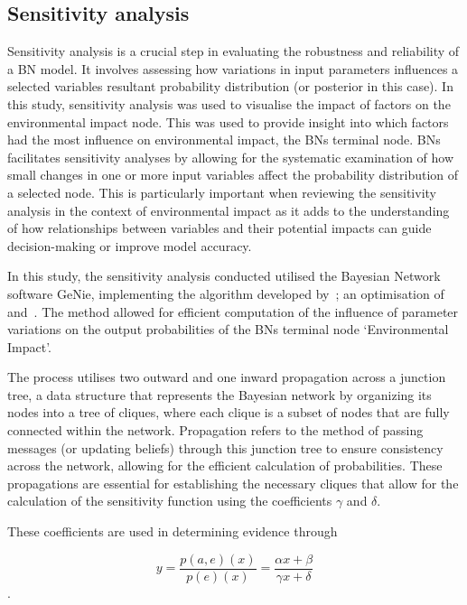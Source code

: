 \documentclass[fleqn,10pt]{wlscirep}
\begin{document}
\subsection*{Sensitivity analysis}

Sensitivity analysis is a crucial step in evaluating the robustness and reliability of a BN model. It involves assessing how variations in input parameters influences a selected variables resultant probability distribution (or posterior in this case). In this study, sensitivity analysis was used to visualise the impact of factors on the environmental impact node. This was used to provide insight into which factors had the most influence on environmental impact, the BNs terminal node. BNs facilitates sensitivity analyses by allowing for the systematic examination of how small changes in one or more input variables affect the probability distribution of a selected node. This is particularly important when reviewing the sensitivity analysis in the context of environmental impact as it adds to the understanding of how relationships between variables and their potential impacts can guide decision-making or improve model accuracy.

In this study, the sensitivity analysis conducted utilised the Bayesian Network software GeNie, implementing the algorithm developed by~\cite{article}; an optimisation of~\cite{Castillo1996ANM} and~\cite{Gaag1998PracticableSA}. The method allowed for efficient computation of the influence of parameter variations on the output probabilities of the BNs terminal node `Environmental Impact'.

The process utilises two outward and one inward propagation across a junction tree, a data structure that represents the Bayesian network by organizing its nodes into a tree of cliques, where each clique is a subset of nodes that are fully connected within the network. Propagation refers to the method of passing messages (or updating beliefs) through this junction tree to ensure consistency across the network, allowing for the efficient calculation of probabilities. These propagations are essential for establishing the necessary cliques that allow for the calculation of the sensitivity function using the coefficients $\gamma$ and $\delta$.

These coefficients are used in determining evidence through

\begin{equation}
y = \frac{p(a, e)(x)}{p(e)(x)}=\frac{\alpha x + \beta}{\gamma x + \delta}
\end{equation}.
\end{document}
